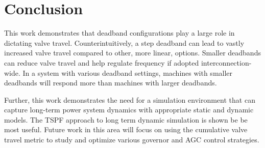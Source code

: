 \section{Conclusion}
This work demonstrates that deadband configurations play a large role in dictating valve travel.
Counterintuitively, a step deadband can lead to vastly increased valve travel compared to other, more linear, options.
Smaller deadbands can reduce valve travel and help regulate frequency if adopted interconnection-wide.
In a system with various deadband settings, machines with smaller deadbands will respond more than machines with larger deadbands.

Further, this work demonstrates the need for a simulation environment that can capture long-term power system dynamics with appropriate static and dynamic models. 
The TSPF approach to long term dynamic simulation is shown be be most useful.
Future work in this area will focus on using the cumulative valve travel metric to study and optimize various governor and AGC control strategies.

